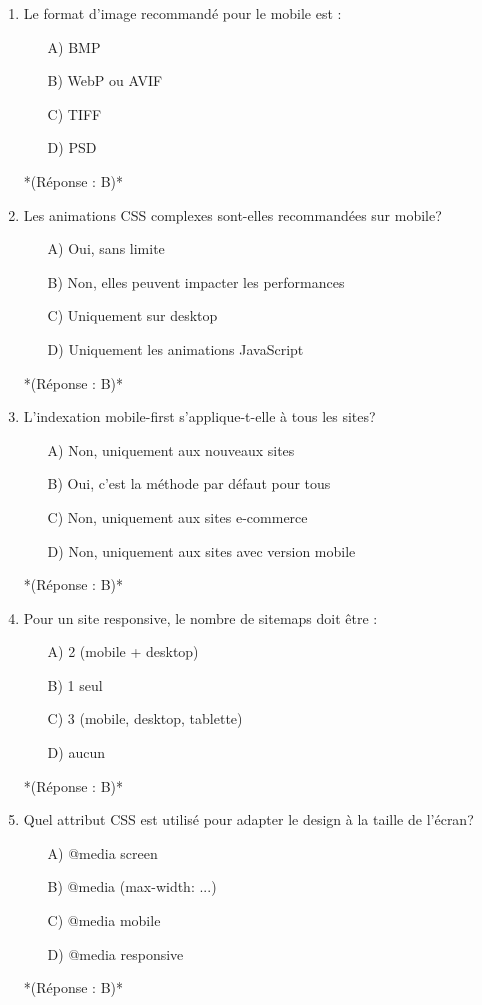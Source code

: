 \documentclass[12pt,a4paper,twoside]{report}
\begin{document}
\begin{enumerate}
\item Le format d'image recommandé pour le mobile est :
\begin{itemize}
\item[A)] BMP
\item[B)] WebP ou AVIF
\item[C)] TIFF
\item[D)] PSD
\end{itemize}
*(Réponse : B)*

\item Les animations CSS complexes sont-elles recommandées sur mobile?
\begin{itemize}
\item[A)] Oui, sans limite
\item[B)] Non, elles peuvent impacter les performances
\item[C)] Uniquement sur desktop
\item[D)] Uniquement les animations JavaScript
\end{itemize}
*(Réponse : B)*

\item L'indexation mobile-first s'applique-t-elle à tous les sites?
\begin{itemize}
\item[A)] Non, uniquement aux nouveaux sites
\item[B)] Oui, c'est la méthode par défaut pour tous
\item[C)] Non, uniquement aux sites e-commerce
\item[D)] Non, uniquement aux sites avec version mobile
\end{itemize}
*(Réponse : B)*

\item Pour un site responsive, le nombre de sitemaps doit être :
\begin{itemize}
\item[A)] 2 (mobile + desktop)
\item[B)] 1 seul
\item[C)] 3 (mobile, desktop, tablette)
\item[D)] aucun
\end{itemize}
*(Réponse : B)*

\item Quel attribut CSS est utilisé pour adapter le design à la taille de l'écran?
\begin{itemize}
\item[A)] @media screen
\item[B)] @media (max-width: ...)
\item[C)] @media mobile
\item[D)] @media responsive
\end{itemize}
*(Réponse : B)*


\end{enumerate}
\end{document}
